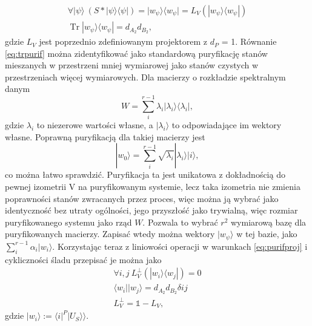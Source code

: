 \documentclass[10pt]{article} %
\DeclareMathOperator{\Trs}{Tr}
\newcommand{\Ket}[1]{|#1\rangle}
\newcommand{\Bra}[1]{\langle#1|}
\newcommand{\KKet}[1]{|#1\rangle\rangle}
\newcommand{\KP}{\Ket{\psi}}
\newcommand{\BP}{\Bra{\psi}}
\newcommand{\I}{\mathbb{1}}
\begin{document}
\begin{gather}
\forall \Ket{\psi} ~(S * \KP \BP) = \Ket{w_\psi}\Bra{w_\psi} = L_V(\Ket{w_\psi}\Bra{w_\psi}) \nonumber \\
\label{eq:purifproj}
 \Trs \Ket{w_\psi} \Bra{w_\psi} = d_{A_2}d_{B_2},
\end{gather}
gdzie $L_V$ jest poprzednio zdefiniowanym projektorem z $d_P$ = 1.
Równanie \eqref{eq:trpurif} można zidentyfikować jako standardową puryfikację stanów mieszanych w przestrzeni mniej wymiarowej jako stanów
czystych w przestrzeniach więcej wymiarowych. Dla macierzy o rozkładzie spektralnym danym
\begin{equation}
W = \sum^{r-1}_i \lambda_i \Ket{\lambda_i}\Bra{\lambda_i},
\end{equation}
gdzie $\lambda_i$ to niezerowe wartości własne, a $\Ket{\lambda_i}$ to odpowiadające im wektory własne.
Poprawną puryfikacją dla takiej macierzy jest
\begin{equation}
\Ket{w_0} = \sum^{r-1}_i \sqrt{\lambda_i} \Ket{\lambda_i} \Ket{i},
\end{equation}
co można łatwo sprawdzić. Puryfikacja ta jest unikatowa z dokładnością do pewnej izometrii V na puryfikowanym systemie, lecz taka izometria nie zmienia
poprawności stanów zwracanych przez proces, więc można ją wybrać jako identyczność bez utraty ogólności, jego przyszłość jako trywialną, więc rozmiar puryfikowanego systemu jako rząd $W$. Pozwala to wybrać $r^2$ wymiarową bazę dla puryfikowanych macierzy. Zapisać wtedy można wektory
$\Ket{w_\psi}$ w tej bazie, jako $\sum^{r-1}_i \alpha_i \Ket{w_i}$. Korzystając teraz z liniowości operacji w warunkach \eqref{eq:purifproj} i cykliczności śladu przepisać je można jako
\begin{gather}
\forall i,j ~L^\perp_V\left(\Ket{w_i}\Bra{w_j}\right) = 0 \nonumber\\
\Bra{w_i}\Ket{w_j} = d_{A_2}d_{B_2}\delta{ij} \\
L^\perp_V = \I - L_V \nonumber,
\end{gather} gdzie $\Ket{w_i} := \Bra{i}^P \KKet{U_S}$.
\end{document}
